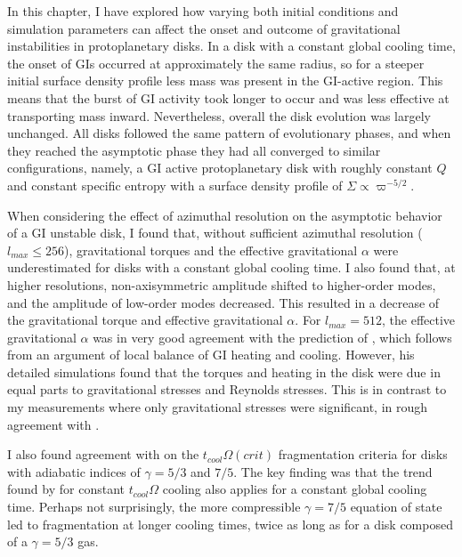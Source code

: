 In this chapter, I have explored how varying both initial conditions and simulation parameters can affect the onset and outcome of gravitational instabilities in protoplanetary disks. In a disk with a constant global cooling time, the onset of GIs occurred at approximately the same radius, so for a steeper initial surface density profile less mass was present in the GI-active region. This means that the burst of GI activity took longer to occur and was less effective at transporting mass inward. Nevertheless, overall the disk evolution was largely unchanged. All disks followed the same pattern of evolutionary phases, and when they reached the asymptotic phase they had all converged to similar configurations, namely, a GI active protoplanetary disk with roughly constant $Q$ and constant specific entropy with a surface density profile of $\Sigma \propto \varpi^{-5/2}$.

When considering the effect of azimuthal resolution on the asymptotic behavior of a GI unstable disk, I found that, without sufficient azimuthal resolution ($l_{max} \leq 256$), gravitational torques and the effective gravitational $\alpha$ were underestimated for disks with a constant global cooling time. I also found that, at higher resolutions, non-axisymmetric amplitude shifted to higher-order modes, and the amplitude of low-order modes decreased. This resulted in a decrease of the gravitational torque and effective gravitational $\alpha$. For $l_{max} =512$, the effective gravitational $\alpha$ was in very good agreement with the prediction of \citet{gammie2001}, which follows from an argument of local balance of GI heating and cooling. However, his detailed simulations found that the torques and heating in the disk were due in equal parts to gravitational stresses and Reynolds stresses. This is in contrast to my measurements where only gravitational stresses were significant, in rough agreement with \citet{lodato2004}. 

I also found agreement with \citet{rice2005} on the $t_{cool}\Omega (crit)$ fragmentation criteria for disks with adiabatic indices of $\gamma = 5/3$ and $7/5$. The key finding was that the trend found by \citeauthor{rice2005} for constant $t_{cool}\Omega$ cooling also applies for a constant global cooling time. Perhaps not surprisingly, the more compressible $\gamma =7/5$ equation of state led to fragmentation at longer cooling times, twice as long as for a disk composed of a $\gamma = 5/3$ gas. 

